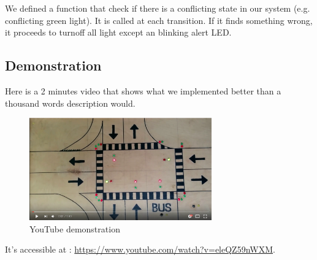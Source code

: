 We defined a function that check if there is a conflicting state in our system (e.g. conflicting green light). It is called at each transition. If it finds something wrong, it proceeds to turnoff all light except an blinking alert LED.


\subsection{Demonstration}

Here is a 2 minutes video that shows what we implemented better than a thousand words description would.

\begin{figure}[H]\label{fig:ytv}
  \centering
    \includegraphics[width=0.7\textwidth]{picture/demo.png}
    \caption{YouTube demonstration}
\end{figure}

It's accessible at :  \url{https://www.youtube.com/watch?v=eleQZ59nWXM}.